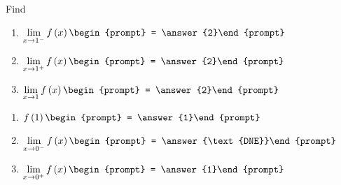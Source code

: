 \documentclass{ximera}
\begin{document}
\begin{exercise}
Find
\noindent\begin{minipage}[t]{.5\linewidth}
\begin{enumerate}
\item		$\lim_{x\to 1^-} f\p{x}\begin{prompt} = \answer{2}\end{prompt}$
\item		$\lim_{x\to 1^+} f\p{x}\begin{prompt} = \answer{2}\end{prompt}$
\item		$\lim_{x\to 1} f\p{x}\begin{prompt} = \answer{2}\end{prompt}$
\end{enumerate}
\end{minipage}
\noindent\begin{minipage}[t]{.5\linewidth}
\begin{enumerate}\addtocounter{enumi}{3}
\item		$f\p{1}\begin{prompt} = \answer{1}\end{prompt}$
\item		$\lim_{x\to 0^-} f\p{x}\begin{prompt} = \answer{\text{DNE}}\end{prompt}$
\item		$\lim_{x\to 0^+} f\p{x}\begin{prompt} = \answer{1}\end{prompt}$
\end{enumerate}
\end{minipage}

\end{exercise}
\end{document}
